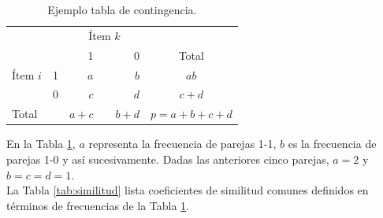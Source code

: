 \documentclass[a4paper, 20pt]{article}
\begin{document}
\begin{table}[H]
  \centering
  \caption{Ejemplo tabla de contingencia.}
  \label{tab:contingencia}
\resizebox{7cm}{!} {
  \begin{tabular}{llrrrrr}
    \toprule
\multicolumn{2}{l}{\multirow{2}{*}{}} & \multicolumn{3}{c}{Ítem $k$} & \multicolumn{2}{c}{} \\\cmidrule{3-5}
\multicolumn{2}{l}{}                  & 1        &       & 0       & \multicolumn{2}{c}{{Total}}                        \\
\midrule
{Ítem $i$}       & 1      & $a$        &       & $b$       & \multicolumn{2}{c}{$ab$}                     \\
                              & 0      & $c$        &       & $d$       & \multicolumn{2}{c}{$c+d$}                     \\ \midrule
\multicolumn{2}{l}{Total}            & $a+c$      &       & $b+d$     & \multicolumn{2}{c}{$p=a+b+c+d$}\\
\bottomrule
\end{tabular}
}
\end{table}

En la Tabla \ref{tab:contingencia}, $a$ representa la frecuencia de parejas 1-1, $b$ es la frecuencia de parejas 1-0 y así sucesivamente. Dadas las anteriores cinco parejas, $a=2$ y $b=c=d=1$.\\

La Tabla \ref{tab:similitud} lista coeficientes de similitud comunes definidos en términos de frecuencias de la Tabla \ref{tab:contingencia}.
\end{document}
